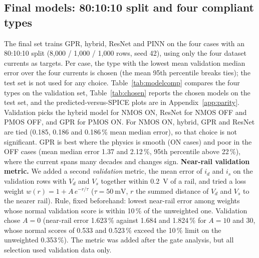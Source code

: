 \subsection{Final models: 80:10:10 split and four compliant types}\label{sec:models:final}
The final set trains GPR, hybrid, ResNet and PINN on the four cases with an 80:10:10 split (8,000 / 1,000 / 1,000 rows, seed 42), using only the four dataset currents as targets. Per case, the type with the lowest mean validation median error over the four currents is chosen (the mean 95th percentile breaks ties); the test set is not used for any choice. Table~\ref{tab:modelcomp} compares the four types on the validation set, Table~\ref{tab:chosen} reports the chosen models on the test set, and the predicted-versus-SPICE plots are in Appendix~\ref{app:parity}.
Validation picks the hybrid model for NMOS ON, ResNet for NMOS OFF and PMOS OFF, and GPR for PMOS ON. For NMOS ON, hybrid, GPR and ResNet are tied (0.185, 0.186 and 0.186\,\% mean median error), so that choice is not significant. GPR is best where the physics is smooth (ON cases) and poor in the OFF cases (mean median error 1.37 and 2.12\,\%, 95th percentile above 22\,\%), where the current spans many decades and changes sign.
\textbf{Near-rail validation metric.} We added a second \emph{validation} metric, the mean error of $i_d$ and $i_s$ on the validation rows with $V_d$ and $V_s$ together within \SI{0.2}{\volt} of a rail, and tried a loss weight $w(r)=1+A\,e^{-r/\tau}$ ($\tau=\SI{50}{\milli\volt}$, $r$ the summed distance of $V_d$ and $V_s$ to the nearer rail). Rule, fixed beforehand: lowest near-rail error among weights whose normal validation score is within 10\,\% of the unweighted one. Validation chose $A=0$ (near-rail error 1.623\,\% against 1.684 and 1.824\,\% for $A=10$ and 30, whose normal scores of 0.533 and 0.523\,\% exceed the 10\,\% limit on the unweighted 0.353\,\%). The metric was added after the gate analysis, but all selection used validation data only.

